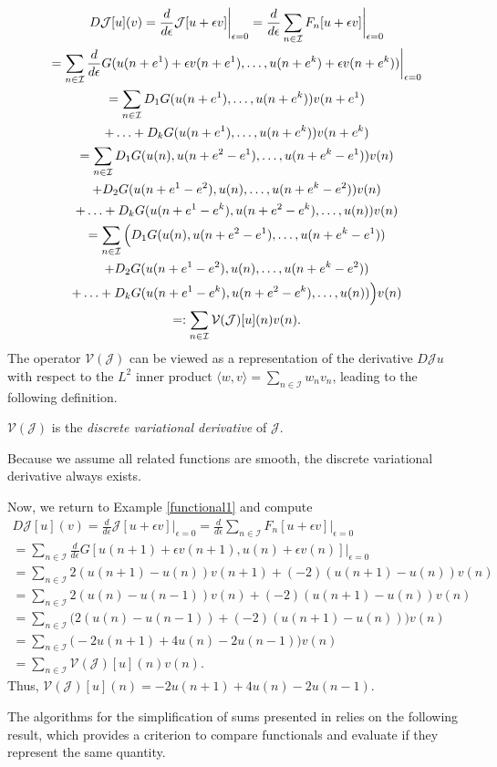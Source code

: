 \documentclass[runningheads]{llncs}
\newcommand{\1}{\chi}
\newcommand{\Ii}{\mathcal{I}}
\begin{document}
\begin{gather}
	\notag	D\mathcal{J}[u](v)=\frac{d}{d\epsilon}\mathcal{J}[u+\epsilon v]\bigg|_{\epsilon=0}=\frac{d}{d\epsilon}\sum_{n\in\Ii}F_n[u+\epsilon v]\bigg|_{\epsilon=0}\\
	\notag	=\sum_{n\in\Ii}\frac{d}{d\epsilon}G(u(n+e^1)+\epsilon v(n+e^1),\ldots,u(n+e^k)+\epsilon v(n+e^k))\bigg|_{\epsilon=0}\\
	\notag	=\sum_{n\in\Ii}D_1G(u(n+e^1),\ldots,u(n+e^k))v(n+e^1)\\
	\notag	+\ldots+D_kG(u(n+e^1),\ldots,u(n+e^k))v(n+e^k)\\
	\label{periodicity}	=\sum_{n\in\Ii}D_1G(u(n),u(n+e^2-e^1),\ldots,u(n+e^k-e^1))v(n)\\
	\notag	+D_2G(u(n+e^1-e^2),u(n),\ldots,u(n+e^k-e^2))v(n)\\
	\notag	+\ldots+D_kG(u(n+e^1-e^k),u(n+e^2-e^k),\ldots,u(n))v(n)\\
	\notag	=\sum_{n\in\Ii}\Big(D_1G(u(n),u(n+e^2-e^1),\ldots,u(n+e^k-e^1))\\
	\notag	+D_2G(u(n+e^1-e^2),u(n),\ldots,u(n+e^k-e^2))\\
	\notag	+\ldots+D_kG(u(n+e^1-e^k),u(n+e^2-e^k),\ldots,u(n))\Big)v(n)\\
	\notag	=:\sum_{n\in\Ii}\mathcal{V}(\mathcal{J})[u](n)v(n).	
\end{gather}
The operator $\mathcal{V}(\mathcal{J})$ can be viewed as a representation of the derivative $D\mathcal{J}u$ with respect to the $L^2$ inner product $\langle w, v\rangle=\sum_{n\in \Ii} w_n v_n$, leading to the following definition.
\begin{definition}
	$\mathcal{V}(\mathcal{J})$ is the \emph{discrete variational derivative} of $\mathcal{J}$.
\end{definition}
Because we assume all related functions are smooth, the discrete variational derivative always exists.
\begin{example}
Now, we return to Example \ref{functional1} and compute
	\begin{gather*}
		D\mathcal{J}[u](v)=\frac{d}{d\epsilon}\mathcal{J}[u+\epsilon v]\bigg|_{\epsilon=0}=\frac{d}{d\epsilon}\sum_{n\in\Ii}F_n[u+\epsilon v]\bigg|_{\epsilon=0}\\
		=\sum_{n\in\Ii}\frac{d}{d\epsilon}G[u(n+1)+\epsilon v(n+1),u(n)+\epsilon v(n)]\bigg|_{\epsilon=0}\\
		=\sum_{n\in\Ii}2(u(n+1)-u(n))v(n+1)+(-2)(u(n+1)-u(n))v(n)\\
		=\sum_{n\in\Ii}2(u(n)-u(n-1))v(n)+(-2)(u(n+1)-u(n))v(n)\\
		=\sum_{n\in\Ii}\Big(2(u(n)-u(n-1))+(-2)(u(n+1)-u(n))\Big)v(n)\\
		=\sum_{n\in\Ii}\Big(-2u(n+1)+4u(n)-2u(n-1)\Big)v(n)\\
		=\sum_{n\in\Ii}\mathcal{V}(\mathcal{J})[u](n)v(n).
	\end{gather*}
Thus, $\mathcal{V}(\mathcal{J})[u](n)=-2u(n+1)+4u(n)-2u(n-1)$.
\end{example}
The algorithms for the simplification of sums presented in \cite{gomes20} relies on the following result, which 
provides a criterion to compare functionals and evaluate if they represent the same quantity.
\end{document}
